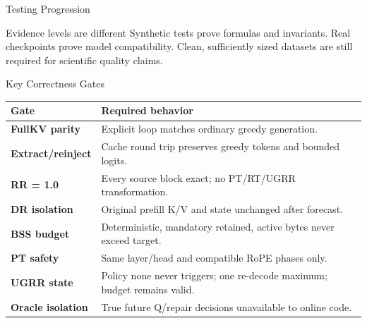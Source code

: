 \documentclass[aspectratio=169,10pt]{beamer}
\begin{document}
\begin{frame}{Testing Progression}
\small
\begin{center}
\end{center}
\begin{block}{Evidence levels are different}
Synthetic tests prove formulas and invariants. Real checkpoints prove model compatibility. Clean,
sufficiently sized datasets are still required for scientific quality claims.
\end{block}
\end{frame}

\begin{frame}{Key Correctness Gates}
\scriptsize
\begin{tabularx}{\textwidth}{>{\bfseries}p{}X}
\toprule
Gate & Required behavior \\
\midrule
FullKV parity & Explicit loop matches ordinary greedy generation. \\
Extract/reinject & Cache round trip preserves greedy tokens and bounded logits. \\
RR = 1.0 & Every source block exact; no PT/RT/UGRR transformation. \\
DR isolation & Original prefill K/V and state unchanged after forecast. \\
BSS budget & Deterministic, mandatory retained, active bytes never exceed target. \\
PT safety & Same layer/head and compatible RoPE phases only. \\
UGRR state & Policy none never triggers; one re-decode maximum; budget remains valid. \\
Oracle isolation & True future Q/repair decisions unavailable to online code. \\
\bottomrule
\end{tabularx}
\end{frame}
\end{document}
